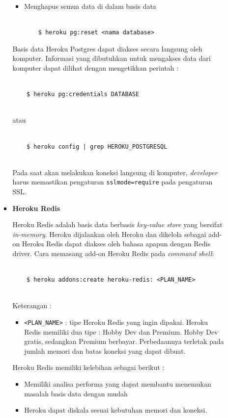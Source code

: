 \documentclass[a4paper,twoside]{article}
\begin{document}
\begin{enumerate}
\begin{enumerate}
\begin{itemize}
\begin{itemize}
\item Menghapus semua data di dalam basis data

\begin{lstlisting}

	$ heroku pg:reset <nama database>

\end{lstlisting}
\end{itemize}

Basis data Heroku Postgres dapat diakses secara langsung oleh komputer. Informasi yang dibutuhkan untuk mengakses data dari komputer dapat dilihat dengan mengetikkan perintah :
\begin{lstlisting}

	$ heroku pg:credentials DATABASE
	
\end{lstlisting}
atau
\begin{lstlisting}

	$ heroku config | grep HEROKU_POSTGRESQL
	
\end{lstlisting}
Pada saat akan melakukan koneksi langsung di komputer, \textit{developer} harus memastikan pengaturan \texttt{sslmode=require} pada pengaturan SSL.

\item \textbf{Heroku Redis}

Heroku Redis adalah basis data berbasis \textit{key-value store} yang bersifat \textit{in-memory}. Heroku dijalankan oleh Heroku dan dikelola sebagai add-on Heroku Redis dapat diakses oleh bahasa apapun dengan Redis driver. Cara memasang add-on Heroku Redis pada \textit{command shell}:
\begin{lstlisting}
	
	$ heroku addons:create heroku-redis: <PLAN_NAME>
	
\end{lstlisting}
Keterangan :
\begin{itemize}
\item \texttt{<PLAN\_NAME>} : tipe Heroku Redis yang ingin dipakai. Heroku Redis memiliki dua tipe : Hobby Dev dan Premium. Hobby Dev gratis, sedangkan Premium berbayar. Perbedaannya terletak pada jumlah memori dan batas koneksi yang dapat dibuat.
\end{itemize}

Heroku Redis memiliki kelebihan sebagai berikut :
\begin{itemize}
\item Memiliki analisa performa yang dapat membantu menemukan masalah basis data dengan mudah
\item Heroku dapat diskala sesuai kebutuhan memori dan koneksi.
\end{itemize}


\end{itemize}
\end{enumerate}
\end{enumerate}
\end{document}
